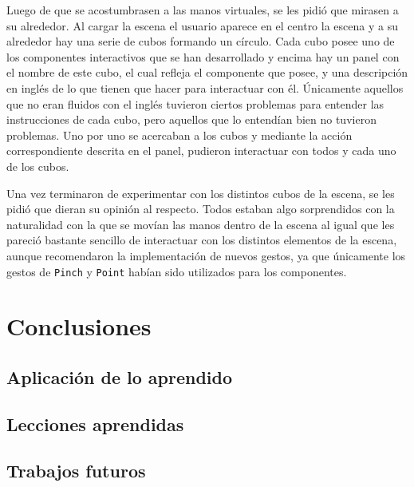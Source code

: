 \documentclass[a4paper, 12pt]{book}
\begin{document}
Luego de que se acostumbrasen a las manos virtuales, se les pidió que mirasen a su alrededor. Al cargar la escena el usuario aparece en el centro la escena y a su alrededor hay una serie de cubos formando un círculo. Cada cubo posee uno de los componentes interactivos que se han desarrollado y encima hay un panel con el nombre de este cubo, el cual refleja el componente que posee, y una descripción en inglés de lo que tienen que hacer para interactuar con él.
Únicamente aquellos que no eran fluidos con el inglés tuvieron ciertos problemas para entender las instrucciones de cada cubo, pero aquellos que lo entendían bien no tuvieron problemas. Uno por uno se acercaban a los cubos y mediante la acción correspondiente descrita en el panel, pudieron interactuar con todos y cada uno de los cubos. 

Una vez terminaron de experimentar con los distintos cubos de la escena, se les pidió que dieran su opinión al respecto. Todos estaban algo sorprendidos con la naturalidad con la que se movían las manos dentro de la escena al igual que les pareció bastante sencillo de interactuar con los distintos elementos de la escena, aunque recomendaron la implementación de nuevos gestos, ya que únicamente los gestos de \texttt{Pinch} y \texttt{Point} habían sido utilizados para los componentes.

\cleardoublepage
\chapter{Conclusiones}
\label{chap:conclusiones}


\section{Aplicación de lo aprendido}
\label{sec:aplicacion}



\section{Lecciones aprendidas}
\label{sec:lecciones_aprendidas}


\section{Trabajos futuros}
\label{sec:trabajos_futuros}


\cleardoublepage


 
\end{document}
